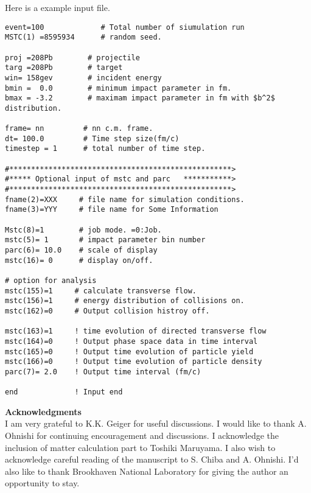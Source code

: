 \documentclass[]{article}
\begin{document}
Here is a example input file.

\begin{verbatim}
event=100             # Total number of siumulation run
MSTC(1) =8595934      # random seed.

proj =208Pb        # projectile
targ =208Pb        # target
win= 158gev        # incident energy
bmin =  0.0        # minimum impact parameter in fm.
bmax = -3.2        # maximam impact parameter in fm with $b^2$ distribution.

frame= nn         # nn c.m. frame.
dt= 100.0         # Time step size(fm/c)
timestep = 1      # total number of time step.

#***************************************************>
#***** Optional input of mstc and parc   ***********>
#***************************************************>
fname(2)=XXX     # file name for simulation conditions.
fname(3)=YYY     # file name for Some Information

Mstc(8)=1        # job mode. =0:Job.
mstc(5)= 1       # impact parameter bin number
parc(6)= 10.0    # scale of display
mstc(16)= 0      # display on/off.

# option for analysis
mstc(155)=1     # calculate transverse flow.
mstc(156)=1     # energy distribution of collisions on.
mstc(162)=0     # Output collision histroy off.

mstc(163)=1     ! time evolution of directed transverse flow
mstc(164)=0     ! Output phase space data in time interval
mstc(165)=0     ! Output time evolution of particle yield
mstc(166)=0     ! Output time evolution of particle density
parc(7)= 2.0    ! Output time interval (fm/c)

end             ! Input end
\end{verbatim}



{\Large \bf Acknowledgments}\\[1ex]

I am very grateful to K.K. Geiger for useful discussions.
I would like to thank A. Ohnishi
  for continuing encouragement and discussions.
I acknowledge the inclusion of matter calculation part
 to Toshiki Maruyama.
I also wish to acknowledge careful reading of the manuscript
 to S. Chiba and A. Ohnishi.
I'd also like to thank Brookhaven National Laboratory for giving the
author an opportunity to stay.
\end{document}
